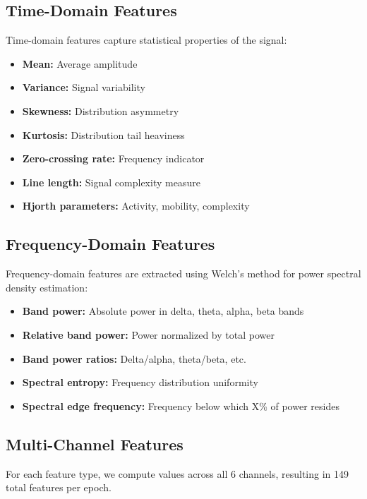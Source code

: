 \subsection{Time-Domain Features}
\label{subsec:time_features}

Time-domain features capture statistical properties of the signal:

\begin{itemize}
    \item \textbf{Mean:} Average amplitude
    \item \textbf{Variance:} Signal variability
    \item \textbf{Skewness:} Distribution asymmetry
    \item \textbf{Kurtosis:} Distribution tail heaviness
    \item \textbf{Zero-crossing rate:} Frequency indicator
    \item \textbf{Line length:} Signal complexity measure
    \item \textbf{Hjorth parameters:} Activity, mobility, complexity
\end{itemize}

\subsection{Frequency-Domain Features}
\label{subsec:freq_features}

Frequency-domain features are extracted using Welch's method for power spectral density estimation:

\begin{itemize}
    \item \textbf{Band power:} Absolute power in delta, theta, alpha, beta bands
    \item \textbf{Relative band power:} Power normalized by total power
    \item \textbf{Band power ratios:} Delta/alpha, theta/beta, etc.
    \item \textbf{Spectral entropy:} Frequency distribution uniformity
    \item \textbf{Spectral edge frequency:} Frequency below which X\% of power resides
\end{itemize}

\subsection{Multi-Channel Features}
\label{subsec:multichannel}

For each feature type, we compute values across all 6 channels, resulting in 149 total features per epoch.

